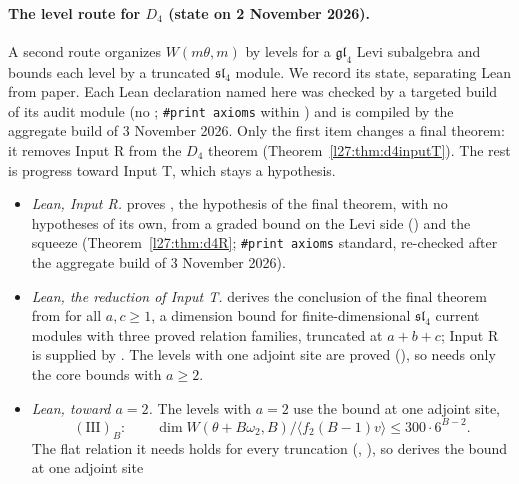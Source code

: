 \paragraph{The level route for $D_4$ (state on 2 November 2026).} A second route organizes $W(m\theta,m)$ by levels for a
$\mathfrak{gl}_4$ Levi subalgebra and bounds each level by a truncated $\mathfrak{sl}_4$ module. We record its state, separating Lean
from paper. Each Lean declaration named here was checked by a targeted build of its audit module (no
; \texttt{\#print axioms} within ) and is compiled by the aggregate
build of 3 November 2026. Only the first item changes a final theorem: it removes Input R from the $D_4$ theorem
(Theorem~\ref{l27:thm:d4inputT}). The rest is progress toward Input T, which stays a hypothesis.
\begin{itemize}
\item \emph{Lean, Input R.}  proves
  , the hypothesis  of the final theorem,
  with no hypotheses of its own, from a graded bound on the Levi side () and the squeeze
  (Theorem~\ref{l27:thm:d4R}; \texttt{\#print axioms} standard, re-checked after the aggregate build of 3 November 2026).
\item \emph{Lean, the reduction of Input T.}  derives the conclusion of the
  final theorem from  for all $a,c\ge1$, a dimension bound for finite-dimensional
  $\mathfrak{sl}_4$ current modules with three proved relation families, truncated at $a+b+c$; Input R is supplied by
  . The levels with one adjoint site are proved (),
  so  needs only the core bounds with $a\ge2$.
\item \emph{Lean, toward $a=2$.} The levels with $a=2$ use the bound at one adjoint site,
  \begin{equation*}
    (\mathrm{III})_B:\qquad \dim W(\theta+B\omega_2,B)/\langle f_2(B-1)v\rangle\le300\cdot6^{B-2}.
  \end{equation*}
  The flat relation it needs holds for every truncation (,
  ), so  derives the bound at one adjoint site

\end{itemize}
